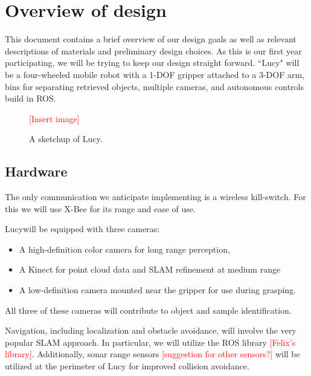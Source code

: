 \documentclass{paper}
\newcommand \todo[1]{\textcolor{red}{[#1]}}
\newcommand \robotName{Lucy} 		%
\begin{document}
\maketitle


\section*{Overview of design}

	This document contains a brief overview of our design goals as well as relevant descriptions of materials and preliminary design choices.  As this is our first year participating, we will be trying to keep our design straight forward.  ``\robotName" will be a four-wheeled mobile robot with a 1-DOF gripper attached to a 3-DOF arm, bins for separating retrieved objects, multiple cameras, and autonomous controls build in ROS.  

\begin{figure}[h]
\centering
\todo{Insert image}
\caption{A sketchup of \robotName. }
\label{fig:robotMockup}
\end{figure}

\subsection*{Hardware}

	The only communication we anticipate implementing is a wireless kill-switch.  For this we will use X-Bee for its range and ease of use.  

	\robotName\text{ }will be equipped with three cameras: 
\begin{itemize}
	\item A high-definition color camera for long range perception, 
	\item A Kinect for point cloud data and SLAM refinement at medium range
	\item A low-definition camera mounted near the gripper for use during grasping.
\end{itemize}
All three of these cameras will contribute to object and sample identification.  

	Navigation, including localization and obstacle avoidance, will involve the very popular SLAM approach.  In particular, we will utilize the ROS library \todo{Felix's library}.  Additionally, sonar range sensors \todo{suggestion for other sensors?} will be utilized at the perimeter of \robotName\text{ } for improved collision avoidance.  
\end{document}
